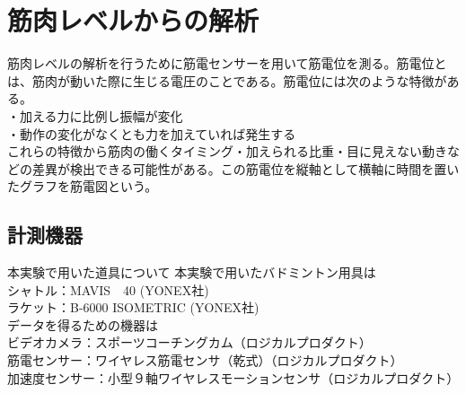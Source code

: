 \documentclass[11pt,a4j,notitlepage]{jreport}
\begin{document}
\chapter{筋肉レベルからの解析}
筋肉レベルの解析を行うために筋電センサーを用いて筋電位を測る。筋電位とは、筋肉が動いた際に生じる電圧のことである。筋電位には次のような特徴がある。\\
・加える力に比例し振幅が変化\\
・動作の変化がなくとも力を加えていれば発生する\\
   これらの特徴から筋肉の働くタイミング・加えられる比重・目に見えない動きなどの差異が検出できる可能性がある。この筋電位を縦軸として横軸に時間を置いたグラフを筋電図という。

\section{計測機器}
本実験で用いた道具について
本実験で用いたバドミントン用具は\\
シャトル：MAVIS　40 (YONEX社)\\
ラケット：B-6000 ISOMETRIC (YONEX社)\\
データを得るための機器は\\
ビデオカメラ：スポーツコーチングカム（ロジカルプロダクト）\\
筋電センサー：ワイヤレス筋電センサ（乾式）（ロジカルプロダクト）\\
加速度センサー：小型９軸ワイヤレスモーションセンサ（ロジカルプロダクト）\\
\\
\end{document}
